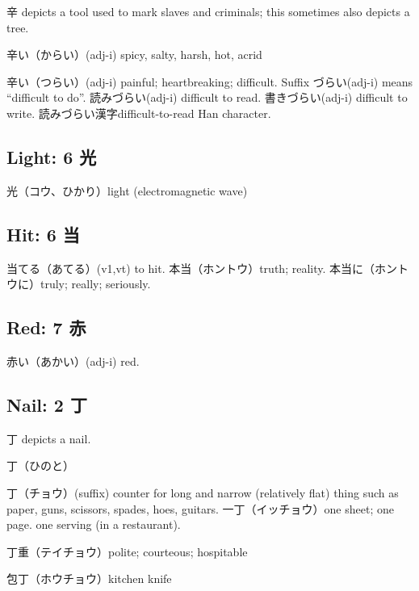 辛 depicts a tool used to mark slaves and criminals;
this sometimes also depicts a tree.

辛い（からい）(adj-i) spicy, salty, harsh, hot, acrid

辛い（つらい）(adj-i) painful; heartbreaking; difficult.
Suffix づらい(adj-i) means ``difficult to do''.
読みづらい(adj-i) difficult to read.
書きづらい(adj-i) difficult to write.
読みづらい漢字difficult-to-read Han character.

\subsection{Light: 6 光}

光（コウ、ひかり）light (electromagnetic wave)

\subsection{Hit: 6 当}

当てる（あてる）(v1,vt) to hit.
本当（ホントウ）truth; reality.
本当に（ホントウに）truly; really; seriously.

\subsection{Red: 7 赤}

赤い（あかい）(adj-i) red.

\subsection{Nail: 2 丁}

丁 depicts a nail.

丁（ひのと）

丁（チョウ）(suffix)
counter for long and narrow (relatively flat) thing
such as paper, guns, scissors, spades, hoes, guitars.
一丁（イッチョウ）one sheet; one page.
one serving (in a restaurant).

丁重（テイチョウ）polite; courteous; hospitable

包丁（ホウチョウ）kitchen knife
